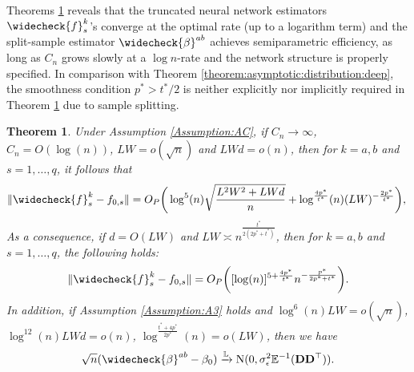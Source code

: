 \documentclass[11pt, preprint]{imsart}
\numberwithin{equation}{section}
\def \bfD{\mathbf{D}}
\def \bfD{\mathbf{D}}
\def \ev{\mathbb{E}}
\def \cid{\xrightarrow[\text{}]{\text{$\mathbb{L}$}}}
\theoremstyle{plain}
\newtheorem{theorem}{\indent Theorem}
\theoremstyle{definition}
\begin{document}
Theorems \ref{theorem:split:sample:DIVE:deep} reveals that the truncated neural network estimators $\widecheck{f}_{s}^k$'s converge at the optimal rate (up to a logarithm term) and the split-sample estimator $\widecheck{\beta}^{ab}$ achieves semiparametric efficiency, as long as $C_n$ grows slowly at a $\log n$-rate and the network structure is properly specified. In comparison with Theorem \ref{theorem:asymptotic:distribution:deep}, the smoothness condition $p^*>t^*/2$ is neither explicitly nor implicitly required in Theorem \ref{theorem:split:sample:DIVE:deep} due to sample splitting. 
\begin{theorem}\label{theorem:split:sample:DIVE:deep}
Under Assumption \ref{Assumption:AC}, if $C_n \to \infty$, $C_n=O(\log(n))$, $LW=o(\sqrt{n})$ and $LWd=o(n)$, then for $k=a,b$ and  $s=1,\ldots, q$, it follows that
\begin{equation}
	\|\widecheck{f}_s^k-f_{0,s}\|=O_P\bigg(\log^5(n)\sqrt{\frac{L^2W^2+LWd}{n}}+\log^{\frac{4p^*}{t^*}}(n)(LW)^{-\frac{2p^*}{t^*}}\bigg),\; \nonumber
\end{equation}
As a consequence, if $d=O(LW)$ and $LW\asymp n^{\frac{t^*}{2(2p^*+t^*)}}$, then for $k=a,b$ and  $s=1,\ldots, q$, the following holds:
\begin{equation*}
	\|\widecheck{f}_s^k-f_{0,s}\|=O_P\bigg([\log(n)]^{5+\frac{4p^*}{t^*}}n^{-\frac{p^*}{2p^*+t^*}}\bigg).
\end{equation*}
In addition, if Assumption \ref{Assumption:A3} holds and $\log^6(n)LW=o(\sqrt{n})$, $\log^{12}(n)LWd=o(n)$, $\log^{\frac{t^*+4p^*}{2p^*}}(n)=o(LW)$, then we have
\begin{equation*}
	\sqrt{n}(\widecheck{\beta}^{ab}-\beta_0)\cid  \textrm{N}(0, \sigma_\epsilon^2 \ev^{-1}(\bfD\bfD^\top)).
\end{equation*}
\end{theorem}

\end{document}
